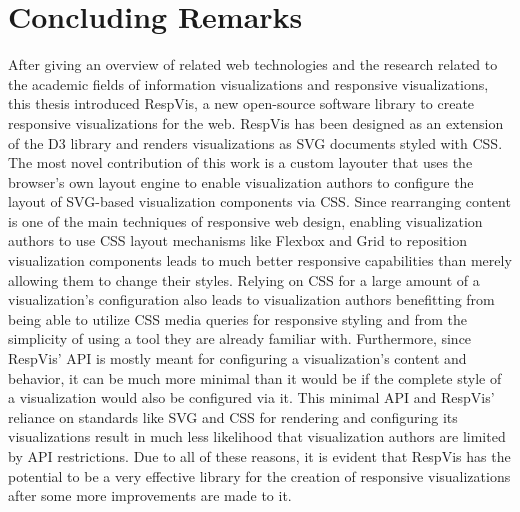 \chapter{Concluding Remarks}
\label{chap:Concl}

After giving an overview of related web technologies and the research related to the academic fields of information visualizations and responsive visualizations, this thesis introduced RespVis, a new open-source software library to create responsive visualizations for the web.
RespVis has been designed as an extension of the D3 library and renders visualizations as SVG documents styled with CSS.
The most novel contribution of this work is a custom layouter that uses the browser's own layout engine to enable visualization authors to configure the layout of SVG-based visualization components via CSS.
Since rearranging content is one of the main techniques of responsive web design, enabling visualization authors to use CSS layout mechanisms like Flexbox and Grid to reposition visualization components leads to much better responsive capabilities than merely allowing them to change their styles.
Relying on CSS for a large amount of a visualization's configuration also leads to visualization authors benefitting from being able to utilize CSS media queries for responsive styling and from the simplicity of using a tool they are already familiar with.
Furthermore, since RespVis' API is mostly meant for configuring a visualization's content and behavior, it can be much more minimal than it would be if the complete style of a visualization would also be configured via it.
This minimal API and RespVis' reliance on standards like SVG and CSS for rendering and configuring its visualizations result in much less likelihood that visualization authors are limited by API restrictions.
Due to all of these reasons, it is evident that RespVis has the potential to be a very effective library for the creation of responsive visualizations after some more improvements are made to it.
